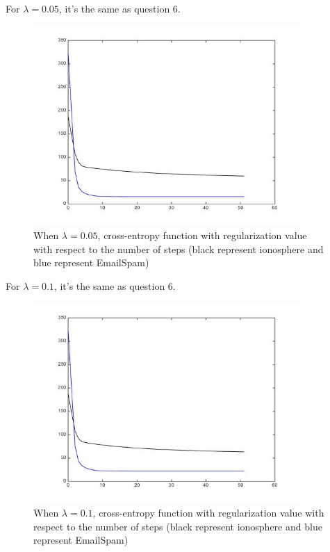 \documentclass[11pt]{article}
\numberwithin{equation}{section}
\begin{document}
	For $\lambda = 0.05$, it's the same as question 6.
	\begin{figure} [H]
    	\centering 
    	\includegraphics[width=4in]{Q7005} 
    	\caption{When $\lambda = 0.05$, cross-entropy function with regularization value with respect to the number of steps (black represent ionosphere and blue represent EmailSpam)} 
    	\label{fig:side:a} 
	\end{figure}

	For $\lambda = 0.1$, it's the same as question 6.
	\begin{figure} [H]
    	\centering 
    	\includegraphics[width=4in]{Q701} 
    	\caption{When $\lambda = 0.1$, cross-entropy function with regularization value with respect to the number of steps (black represent ionosphere and blue represent EmailSpam)} 
    	\label{fig:side:a} 
	\end{figure}
\end{document}
